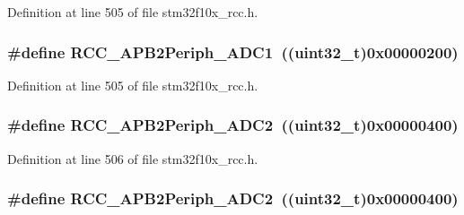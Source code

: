 Definition at line 505 of file stm32f10x\+\_\+rcc.\+h.

\subsubsection[{\texorpdfstring{R\+C\+C\+\_\+\+A\+P\+B2\+Periph\+\_\+\+A\+D\+C1}{RCC_APB2Periph_ADC1}}]{\setlength{\rightskip}{0pt plus 5cm}\#define R\+C\+C\+\_\+\+A\+P\+B2\+Periph\+\_\+\+A\+D\+C1~(({\bf uint32\+\_\+t})0x00000200)}\hypertarget{group___a_p_b2__peripheral_gacd24acb2cd5ca208652157f6c13d3145}{}\label{group___a_p_b2__peripheral_gacd24acb2cd5ca208652157f6c13d3145}


Definition at line 505 of file stm32f10x\+\_\+rcc.\+h.

\subsubsection[{\texorpdfstring{R\+C\+C\+\_\+\+A\+P\+B2\+Periph\+\_\+\+A\+D\+C2}{RCC_APB2Periph_ADC2}}]{\setlength{\rightskip}{0pt plus 5cm}\#define R\+C\+C\+\_\+\+A\+P\+B2\+Periph\+\_\+\+A\+D\+C2~(({\bf uint32\+\_\+t})0x00000400)}\hypertarget{group___a_p_b2__peripheral_ga4fd76e573e827702568d6064e33448b5}{}\label{group___a_p_b2__peripheral_ga4fd76e573e827702568d6064e33448b5}


Definition at line 506 of file stm32f10x\+\_\+rcc.\+h.

\subsubsection[{\texorpdfstring{R\+C\+C\+\_\+\+A\+P\+B2\+Periph\+\_\+\+A\+D\+C2}{RCC_APB2Periph_ADC2}}]{\setlength{\rightskip}{0pt plus 5cm}\#define R\+C\+C\+\_\+\+A\+P\+B2\+Periph\+\_\+\+A\+D\+C2~(({\bf uint32\+\_\+t})0x00000400)}\hypertarget{group___a_p_b2__peripheral_ga4fd76e573e827702568d6064e33448b5}{}\label{group___a_p_b2__peripheral_ga4fd76e573e827702568d6064e33448b5}



